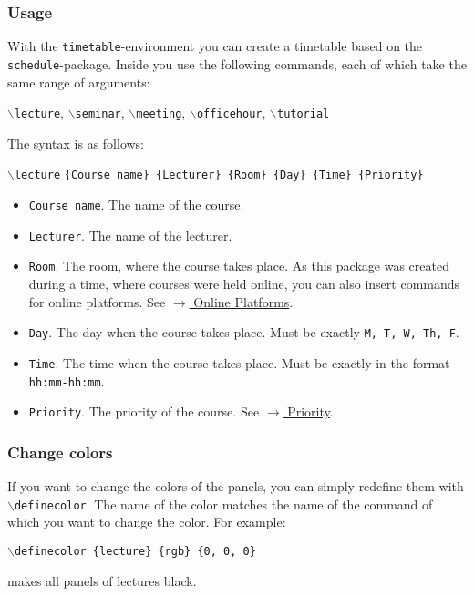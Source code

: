 \documentclass{article}
\newcommand{\cmd}[1]{$\backslash$\texttt{{#1}}}
\begin{document}
	\subsubsection{Usage}
	With the \texttt{timetable}-environment you can create a timetable based on the \texttt{schedule}-package.
	Inside you use the following commands, each of which take the same range of arguments:
	\begin{center}
		\cmd{lecture}, \cmd{seminar}, \cmd{meeting}, \cmd{officehour}, \cmd{tutorial}
	\end{center}
	The syntax is as follows:
	\begin{center}
		\cmd{lecture} \texttt{\{Course name\} \{Lecturer\} \{Room\} \{Day\} \{Time\} \{Priority\}}
	\end{center}
	\begin{itemize}
		\item \texttt{Course name}.
		The name of the course.
		
		\item \texttt{Lecturer}.
		The name of the lecturer.
		
		\item \texttt{Room}.
		The room, where the course takes place. As this package was created during a time, where courses were held online, you can also insert commands for online platforms. See \hyperref[online]{$\rightarrow$ Online Platforms}.
		
		\item \texttt{Day}.
		The day when the course takes place. Must be exactly \texttt{M, T, W, Th, F}.
		
		\item \texttt{Time}.
		The time when the course takes place. Must be exactly in the format \texttt{hh:mm-hh:mm}.
		
		\item \texttt{Priority}.
		The priority of the course. See \hyperref[priority]{$\rightarrow$ Priority}.
	\end{itemize}
	\subsubsection{Change colors}
	If you want to change the colors of the panels, you can simply redefine them with \cmd{definecolor}. The name of the color matches the name of the command of which you want to change the color. For example:
	\begin{center}
		\cmd{definecolor \{lecture\} \{rgb\} \{0, 0, 0\}}
	\end{center}
	makes all panels of lectures black.
	
\end{document}
